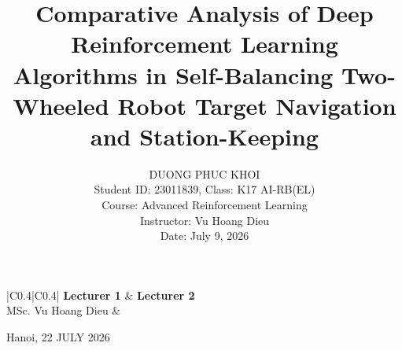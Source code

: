 \documentclass[journal,twocolumn]{IEEEtran}
\begin{document}
\begin{titlepage}
\vfill

\begin{center}
\end{center}

\vfill

\begin{center}
\renewcommand{\arraystretch}{1.4}
\begin{tabular}{|C{0.4\textwidth}|C{0.4\textwidth}|}
\hline
\textbf{Lecturer 1} & \textbf{Lecturer 2} \\[0.2cm]
\hline
\vspace*{0.1cm}MSc. Vu Hoang Dieu\vspace*{1.4cm}  & \vspace*{1.4cm} \\[0.2cm]
\hline
\end{tabular}
\end{center}

\vfill

{\large Hanoi, 22 JULY 2026}

\end{titlepage}

\clearpage
\twocolumn 
\justifying 

\title{Comparative Analysis of Deep Reinforcement Learning Algorithms in Self-Balancing Two-Wheeled Robot Target Navigation and Station-Keeping}

\author{DUONG PHUC KHOI \\
Student ID: 23011839, Class: K17 AI-RB(EL) \\
Course: Advanced Reinforcement Learning \\
Instructor: Vu Hoang Dieu \\
Date: July 9, 2026}
\maketitle
\end{document}
